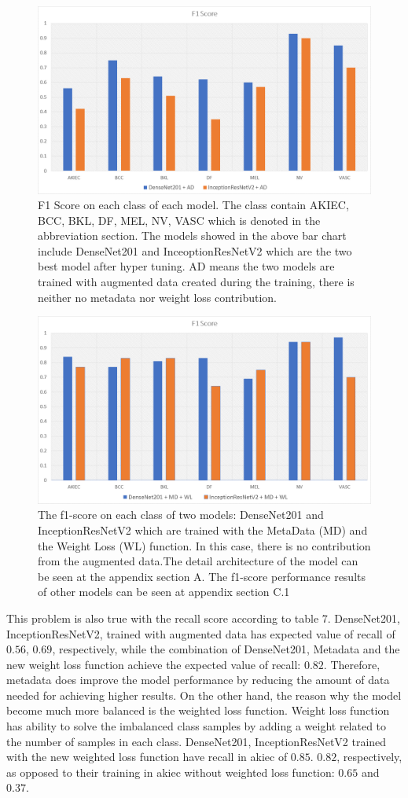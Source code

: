 \documentclass[sensors,article,submit,pdftex,moreauthors]{Definitions/mdpi}
\begin{document}
\begin{figure}[H]
	\centering
	\includegraphics[width=0.7\linewidth]{Definitions/f1 AD}
	\caption{F1 Score on each class of each model. The class contain AKIEC, BCC, BKL, DF, MEL, NV, VASC which is denoted in the abbreviation section. The models showed in the above bar chart include DenseNet201 and InceoptionResNetV2 which are the two best model after hyper tuning. AD means the two models are trained with augmented data created during the training, there is neither no metadata nor weight loss contribution. }
	\label{fig:f1 AD}
\end{figure}
\begin{figure}[H]
	\centering
	\includegraphics[width=0.7\linewidth]{Definitions/f1 MD WL}
	\caption{The f1-score on each class of two models: DenseNet201 and InceptionResNetV2 which are trained with the MetaData (MD) and the Weight Loss (WL) function. In this case, there is no contribution from the augmented data.The detail architecture of the model can be seen at the appendix section A. The f1-score performance results of other models can be seen at appendix section C.1}
	\label{fig:f1 MD WL}
\end{figure}

This problem is also true with the recall score according to table 7. DenseNet201, InceptionResNetV2, trained with augmented data has expected value of recall of $0.56$, $0.69$, respectively, while the combination of DenseNet201, Metadata and the new weight loss function achieve the expected value of recall: $0.82$. Therefore, metadata does improve the model performance by reducing the amount of data needed for achieving higher results. On the other hand, the reason why the model become much more balanced is the weighted loss function. Weight loss function has ability to solve the imbalanced class samples by adding a weight related to the number of samples in each class. DenseNet201, InceptionResNetV2 trained with the new weighted loss function have recall in akiec of $0.85$. $0.82$, respectively, as opposed to their training in akiec without weighted loss function: $0.65$ and $0.37$. 
\end{document}
